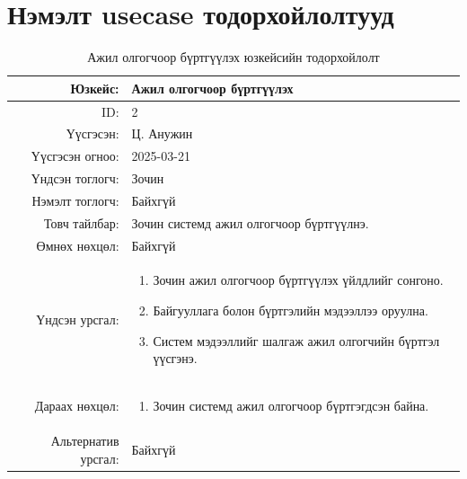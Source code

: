 \chapter*{Нэмэлт usecase тодорхойлолтууд}
\begin{longtable}{|r|p{11.5cm}|}
    \caption{Ажил олгогчоор бүртгүүлэх юзкейсийн тодорхойлолт}
    \label{table:usecase2}\\ \hline
    {Юзкейс:} & {Ажил олгогчоор бүртгүүлэх}\\ \hline
    {ID:} & {2}\\ \hline
    {Үүсгэсэн:} & {Ц. Анужин}\\ \hline
    {Үүсгэсэн огноо:} & {2025-03-21}\\ \hline
    {Үндсэн тоглогч:} & {Зочин}\\ \hline
    {Нэмэлт тоглогч:} & {Байхгүй}\\ \hline
    {Товч тайлбар:} & {Зочин системд ажил олгогчоор бүртгүүлнэ.}\\ \hline
    {Өмнөх нөхцөл:} & {Байхгүй}\\ \hline
    {Үндсэн урсгал:} & {\begin{enumerate}[nosep]
        \item Зочин ажил олгогчоор бүртгүүлэх үйлдлийг сонгоно.
        \item Байгууллага болон бүртгэлийн мэдээллээ оруулна.
        \item Систем мэдээллийг шалгаж ажил олгогчийн бүртгэл үүсгэнэ.
    \end{enumerate}}\\ \hline
    {Дараах нөхцөл:} & {\begin{enumerate}[nosep]
        \item Зочин системд ажил олгогчоор бүртгэгдсэн байна.
    \end{enumerate}}\\ \hline
    {Альтернатив урсгал:} & {Байхгүй}\\ \hline
\end{longtable}

